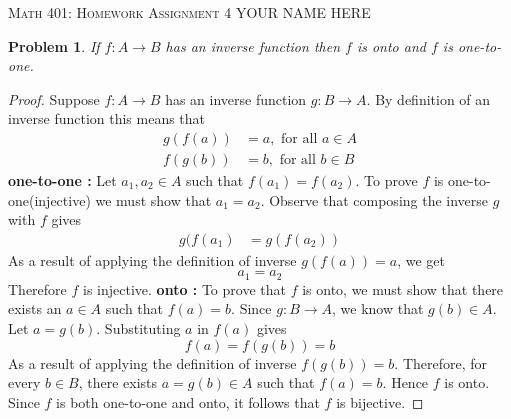 \documentclass[12pt]{article}
\newtheorem{problem}{Problem}
\begin{document}
\small
\noindent \textsc{Math 401: Homework Assignment 4} \hfill YOUR NAME HERE

\normalsize
\bigskip

\setcounter{problem}{21}


\begin{problem} %
If $f:A\to B$ has an inverse function then $f$ is onto and $f$ is one-to-one.
\end{problem}

\begin{proof}
Suppose $f : A \to B$ has an inverse function $g : B \to A$. By definition of an inverse function this means that 
\begin{align*}
	g(f(a)) &= a, \text{ for all } a \in A \\
	f(g(b)) &= b, \text{ for all } b \in B
\end{align*}
\textbf{one-to-one : }Let $a_1, a_2 \in A$ such that $f(a_1) = f(a_2)$. To prove $f$ is one-to-one(injective) we must show that $a_1 = a_2$. Observe that composing the inverse $g$ with $f$ gives
\begin{align*} 
	g(f(a_1) &= g(f(a_2)) 
\end{align*}
As a result of applying the definition of inverse $g(f(a)) = a$, we get
$$a_1 = a_2$$
Therefore $f$ is injective. \newline
\textbf{onto : } To prove that $f$ is onto, we must show that there exists an $a \in A$ such that $f(a) = b$. Since $g : B \to A$, we know that $g(b) \in A$. Let $a = g(b)$. Substituting $a$ in $f(a)$ gives
$$f(a) = f(g(b)) = b$$
As a result of applying the definition of inverse $f(g(b)) = b$.
Therefore, for every $b \in B$, there exists $a =g(b) \in A$ such that $f(a) = b$.
Hence $f$ is onto. \newline \newline
Since $f$ is both one-to-one and onto, it follows that $f$ is bijective.
\end{proof} 



\end{document}
